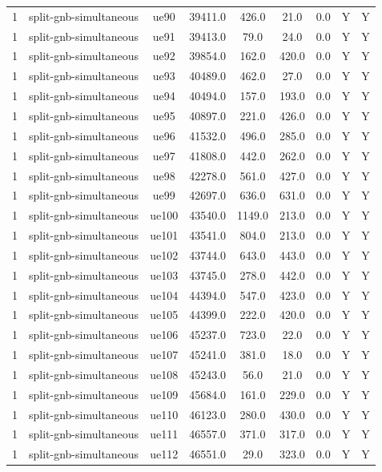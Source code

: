 \begin{table}[ht]
\begin{tabular}{|c|c|c|c|c|c|c|c|c|}
1 & split-gnb-simultaneous & ue90 & 39411.0 & 426.0 & 21.0 & 0.0 & Y & Y \\
1 & split-gnb-simultaneous & ue91 & 39413.0 & 79.0 & 24.0 & 0.0 & Y & Y \\
1 & split-gnb-simultaneous & ue92 & 39854.0 & 162.0 & 420.0 & 0.0 & Y & Y \\
1 & split-gnb-simultaneous & ue93 & 40489.0 & 462.0 & 27.0 & 0.0 & Y & Y \\
1 & split-gnb-simultaneous & ue94 & 40494.0 & 157.0 & 193.0 & 0.0 & Y & Y \\
1 & split-gnb-simultaneous & ue95 & 40897.0 & 221.0 & 426.0 & 0.0 & Y & Y \\
1 & split-gnb-simultaneous & ue96 & 41532.0 & 496.0 & 285.0 & 0.0 & Y & Y \\
1 & split-gnb-simultaneous & ue97 & 41808.0 & 442.0 & 262.0 & 0.0 & Y & Y \\
1 & split-gnb-simultaneous & ue98 & 42278.0 & 561.0 & 427.0 & 0.0 & Y & Y \\
1 & split-gnb-simultaneous & ue99 & 42697.0 & 636.0 & 631.0 & 0.0 & Y & Y \\
1 & split-gnb-simultaneous & ue100 & 43540.0 & 1149.0 & 213.0 & 0.0 & Y & Y \\
1 & split-gnb-simultaneous & ue101 & 43541.0 & 804.0 & 213.0 & 0.0 & Y & Y \\
1 & split-gnb-simultaneous & ue102 & 43744.0 & 643.0 & 443.0 & 0.0 & Y & Y \\
1 & split-gnb-simultaneous & ue103 & 43745.0 & 278.0 & 442.0 & 0.0 & Y & Y \\
1 & split-gnb-simultaneous & ue104 & 44394.0 & 547.0 & 423.0 & 0.0 & Y & Y \\
1 & split-gnb-simultaneous & ue105 & 44399.0 & 222.0 & 420.0 & 0.0 & Y & Y \\
1 & split-gnb-simultaneous & ue106 & 45237.0 & 723.0 & 22.0 & 0.0 & Y & Y \\
1 & split-gnb-simultaneous & ue107 & 45241.0 & 381.0 & 18.0 & 0.0 & Y & Y \\
1 & split-gnb-simultaneous & ue108 & 45243.0 & 56.0 & 21.0 & 0.0 & Y & Y \\
1 & split-gnb-simultaneous & ue109 & 45684.0 & 161.0 & 229.0 & 0.0 & Y & Y \\
1 & split-gnb-simultaneous & ue110 & 46123.0 & 280.0 & 430.0 & 0.0 & Y & Y \\
1 & split-gnb-simultaneous & ue111 & 46557.0 & 371.0 & 317.0 & 0.0 & Y & Y \\
1 & split-gnb-simultaneous & ue112 & 46551.0 & 29.0 & 323.0 & 0.0 & Y & Y \\

\end{tabular}
\end{table}
